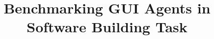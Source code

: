 \documentclass[sigconf,review,anonymous,screen]{acmart}
\theoremstyle{acmdefinition}
\newcommand{\tool}{\textsc{BuildBench}\xspace}
\begin{document}
\title[\tool ]{Benchmarking GUI Agents in Software Building Task}



\renewcommand{\shortauthors}{AAA et al.}



\begin{abstract}

\end{abstract}

\maketitle



% 






\clearpage





\clearpage
\end{document}
